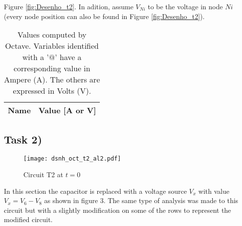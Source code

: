 Figure \ref{fig:Desenho_t2}. In adition, assume $V_{Ni}$ to be the voltage in node $Ni$ (every node position can
also be found in Figure \ref{fig:Desenho_t2}). \\

\begin{table}[H]
	\centering
	\begin{tabular}{|l|r|}
    		\hline    
    		{\bf Name} & {\bf Value [A or V]} \\ \hline
    		
  	\end{tabular}
  	\caption{Values computed by Octave. Variables identified with a '$@$' have a
  	corresponding value in Ampere (A). The others are expressed in Volts (V).}
 
\label{tab:node}
\end{table}
\newpage
\subsection{Task 2)}
\label{subsec:task2_a}

\begin{figure}[H]
	\centering
	\texttt{[image: dsnh\_oct\_t2\_al2.pdf]}
	\caption{Circuit T2 at $t=0$}
\label{fig:Dsnh_sim_t2}
\end{figure}

In this section the capacitor is replaced with a voltage source $V_x$ with value $V_x = V_6 - V_8$ as shown in figure 3. The same type of analysis was made to this circuit but with a slightly modification on some of the rows to represent the modified circuit.


